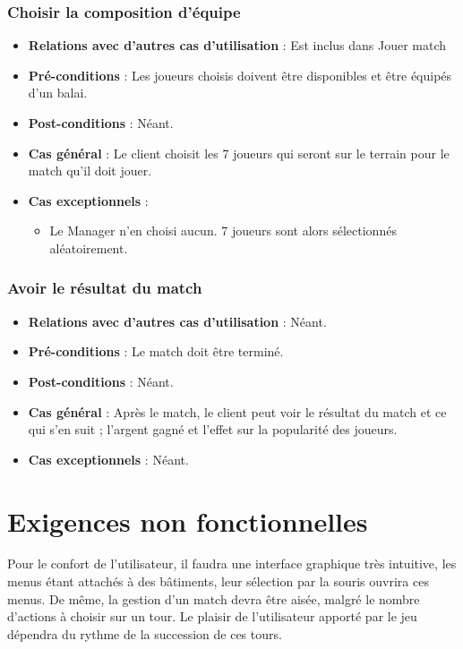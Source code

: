 \documentclass[a4paper,titlepage]{scrreprt}
\begin{document}
    \subsubsection{Choisir la composition d'équipe}
      \begin{itemize}
        \item \textbf{Relations avec d'autres cas d'utilisation}  : Est inclus dans Jouer match
        \item \textbf{Pré-conditions} : Les joueurs choisis doivent être disponibles et être équipés d’un balai.
        \item \textbf{Post-conditions} : Néant.
        \item \textbf{Cas général} : Le client choisit les 7 joueurs qui seront sur le terrain pour le match qu’il doit jouer.
        \item \textbf{Cas exceptionnels} : 
        \begin{itemize}
            \item Le Manager n'en choisi aucun. 7 joueurs sont alors sélectionnés aléatoirement.
          \end{itemize}
      \end{itemize}
    \subsubsection{Avoir le résultat du match}
      \begin{itemize}
        \item \textbf{Relations avec d'autres cas d'utilisation}  : Néant.
        \item \textbf{Pré-conditions} : Le match doit être terminé.
        \item \textbf{Post-conditions} : Néant.
        \item \textbf{Cas général} : Après le match, le client peut voir le résultat du match et ce qui s’en suit ; l’argent gagné et l’effet sur la popularité des joueurs. 
        \item \textbf{Cas exceptionnels} : Néant.
      \end{itemize}

  
\section{Exigences non fonctionnelles}
  Pour le confort de l'utilisateur, il faudra  une interface graphique très intuitive, 
  les menus étant attachés à des  bâtiments, leur sélection par la souris ouvrira ces menus.
  De même, la gestion d'un match devra être aisée, malgré le nombre d'actions à choisir 
  sur un tour. Le plaisir de l'utilisateur apporté par le jeu dépendra du rythme de la succession de ces tours.
\end{document}

